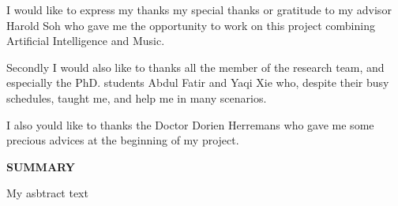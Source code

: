 \documentclass[12pt]{report}
\begin{document}
I would like to express my thanks my special thanks or gratitude to my advisor Harold Soh who gave me the opportunity to work on this project combining Artificial Intelligence and Music.

Secondly I would also like to thanks all the member of the research team, and especially the PhD. students Abdul Fatir and Yaqi Xie who, despite their busy schedules, taught me, and help me in many scenarios.

I also yould like to thanks the Doctor Dorien Herremans who gave me some precious advices at the beginning of my project.

\newpage
\tableofcontents
\newpage


\setlength{\parindent}{0.6cm}


\begin{center}
    \textbf{\Large SUMMARY}
\end{center}
My asbtract text


\listoftables

\end{document}
